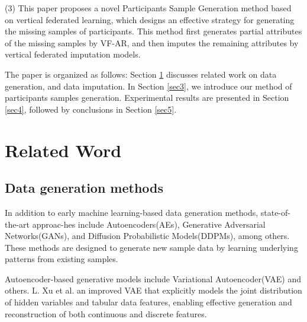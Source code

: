 \documentclass[final,1p,times]{elsarticle}
\begin{document}
(3) This paper proposes a novel Participants Sample Generation method based on vertical federated learning, which designs an effective strategy for generating the missing samples of participants. This method first generates partial attributes of the missing samples by VF-AR, and then imputes the remaining attributes by vertical federated imputation models. 

The paper is organized as follows: Section \ref{sec2} discusses related work on data generation, and data imputation. In Section \ref{sec3}, we introduce our method of participants samples generation. Experimental results are presented in Section \ref{sec4}, followed by conclusions in Section \ref{sec5}.

\section{Related Word}
\label{sec2}

\subsection{Data generation methods}

\label{subsec21}
In addition to early machine learning-based data generation methods, state-of-the-art approac-hes include Autoencoders(AEs), Generative Adversarial Networks(GANs), and Diffusion Probabilistic Models(DDPMs), among others. These methods are designed to generate new sample data by learning underlying patterns from existing samples. 

Autoencoder-based generative models include Variational Autoencoder(VAE)\cite{10} and others. L. Xu et al.\cite{11} an improved VAE that explicitly models the joint distribution of hidden variables and tabular data features, enabling effective generation and reconstruction of both continuous and discrete features.  
 
\end{document}
